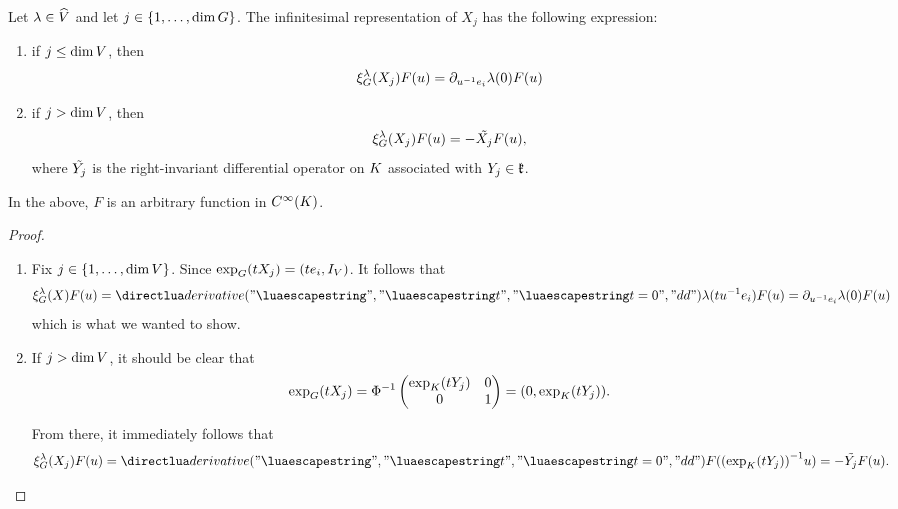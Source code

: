 \begin{proposition}
\label{proposition:infinitesimal_representations_of_differential_operators}
    Let $\lambda \in {\widehat{V}}$ and let $j \in \{1, \dots, \dim G\}$.
    The infinitesimal representation of $X_j$ has the following expression:
    \begin{enumerate}
        \item if $j \leq \dim V$, then
            \begin{align*}
                \xi^{\lambda}_{G}(X_j) F(u) = \partial_{u^{-1} e_i} \lambda(0) F(u)
            \end{align*}
        \item if $j > \dim V$, then
            \begin{align*}
                \xi^{\lambda}_{G}(X_j) F(u) = -\tilde{X_j} F(u),
            \end{align*}
            where $\tilde{Y_j}$ is the right-invariant differential operator on $K$ associated with $Y_j \in \mathfrak{k}$.
    \end{enumerate}
    In the above, $F$ is an arbitrary function in ${C^\infty(K)}$.
\end{proposition}
\begin{proof}
    \begin{enumerate}
        \item Fix $j \in \{1, \dots, \dim V\}$.
            Since $\exp_G(t X_j) = (t e_i, {I_{V}})$.
            It follows that
            \begin{align*}
                \Rep{\lambda}(X) F(u) = \D*{t}<t = 0> \lambda(t u^{-1} e_i) F(u)
                = \directionalDerivative{u^{-1} e_i} \lambda(0) F(u)
            \end{align*}
            which is what we wanted to show.
        \item If $j > \dim V$, it should be clear that
            \begin{align*}
                \exp_G(t X_j) = \Phi^{-1}
                    \begin{pmatrix}
                        \exp_K(t Y_j) & 0\\
                        0 & 1
                    \end{pmatrix}
                    = (0, \exp_K(t Y_j)).
            \end{align*}

            From there, it immediately follows that
            \begin{align*}
                \Rep{\lambda}(X_j) F(u)
                = \D*{t}<t = 0> F({(\exp_\CompactGroup(t Y_j))}^{-1} u)
                = -\RightDifferentialOperatorFirstOrder{Y_j} F(u).
            \end{align*}
    \end{enumerate}
\end{proof}

